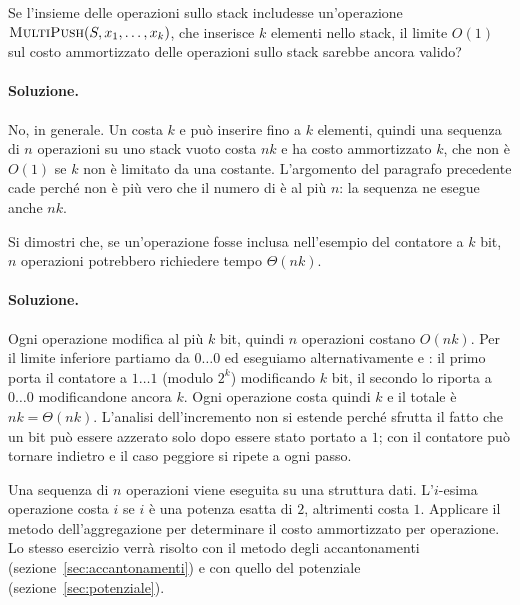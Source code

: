 \begin{esercizio}[\MultiPush]
Se l'insieme delle operazioni sullo stack includesse un'operazione $\textsc{MultiPush}(S,x_1,\dots,x_k)$, che inserisce $k$ elementi nello stack, il limite $O(1)$ sul costo ammortizzato delle operazioni sullo stack sarebbe ancora valido?
\end{esercizio}

\paragraph{Soluzione.}
No, in generale. Un \MultiPush{} costa $k$ e può inserire fino a $k$ elementi, quindi una sequenza di $n$ operazioni \MultiPush{} su uno stack vuoto costa $nk$ e ha costo ammortizzato $k$, che non è $O(1)$ se $k$ non è limitato da una costante. L'argomento del paragrafo precedente cade perché non è più vero che il numero di \Push{} è al più $n$: la sequenza ne esegue anche $nk$.

\begin{esercizio}[\Decrement]
Si dimostri che, se un'operazione \Decrement{} fosse inclusa nell'esempio del contatore a $k$ bit, $n$ operazioni potrebbero richiedere tempo $\Theta(nk)$.
\end{esercizio}

\paragraph{Soluzione.}
Ogni operazione modifica al più $k$ bit, quindi $n$ operazioni costano $O(nk)$. Per il limite inferiore partiamo da $0\dots0$ ed eseguiamo alternativamente \Decrement{} e \Increment: il primo porta il contatore a $1\dots1$ (modulo $2^k$) modificando $k$ bit, il secondo lo riporta a $0\dots0$ modificandone ancora $k$. Ogni operazione costa quindi $k$ e il totale è $nk = \Theta(nk)$. L'analisi dell'incremento non si estende perché sfrutta il fatto che un bit può essere azzerato solo dopo essere stato portato a $1$; con \Decrement{} il contatore può tornare indietro e il caso peggiore si ripete a ogni passo.

\begin{esercizio}\label{es:potenze}
Una sequenza di $n$ operazioni viene eseguita su una struttura dati. L'$i$-esima operazione costa $i$ se $i$ è una potenza esatta di $2$, altrimenti costa $1$. Applicare il metodo dell'aggregazione per determinare il costo ammortizzato per operazione. Lo stesso esercizio verrà risolto con il metodo degli accantonamenti (sezione~\ref{sec:accantonamenti}) e con quello del potenziale (sezione~\ref{sec:potenziale}).
\end{esercizio}

